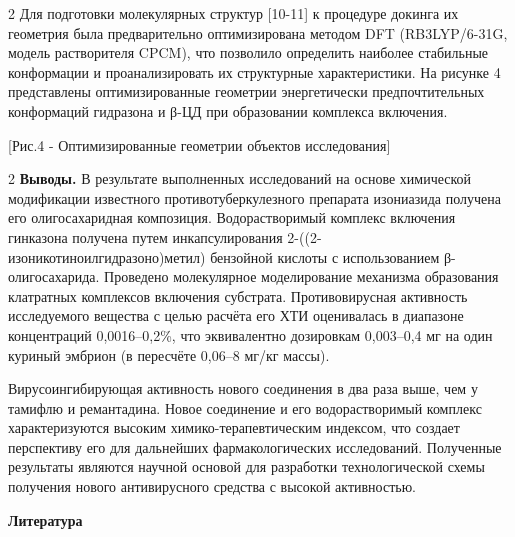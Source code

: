 \begin{multicols}{2}
Для подготовки молекулярных структур {[}10-11{]} к процедуре докинга их
геометрия была предварительно оптимизирована методом DFT (RB3LYP/6-31G,
модель растворителя CPCM), что позволило определить наиболее стабильные
конформации и проанализировать их структурные характеристики. На рисунке
4 представлены оптимизированные геометрии энергетически предпочтительных
конформаций гидразона и β-ЦД при образовании комплекса включения.
\end{multicols}

[Рис.4 - Оптимизированные геометрии объектов исследования]

\begin{multicols}{2}
{\bfseries Выводы.} В результате выполненных исследований на основе
химической модификации известного противотуберкулезного препарата
изониазида получена его олигосахаридная композиция. Водорастворимый
комплекс включения гинказона получена путем инкапсулирования
2-((2-изоникотиноилгидразоно)метил) бензойной кислоты с использованием
β-олигосахарида. Проведено молекулярное моделирование механизма
образования клатратных комплексов включения субстрата. Противовирусная
активность исследуемого вещества с целью расчёта его ХТИ оценивалась в
диапазоне концентраций 0,0016--0,2\%, что эквивалентно дозировкам
0,003--0,4 мг на один куриный эмбрион (в пересчёте 0,06--8 мг/кг массы).

Вирусоингибирующая активность нового соединения в два раза выше, чем у
тамифлю и ремантадина. Новое соединение и его водорастворимый комплекс
характеризуются высоким химико-терапевтическим индексом, что создает
перспективу его для дальнейших фармакологических исследований.
Полученные результаты являются научной основой для разработки
технологической схемы получения нового антивирусного средства с высокой
активностью.
\end{multicols}

\begin{center}
{\bfseries Литература}
\end{center}

